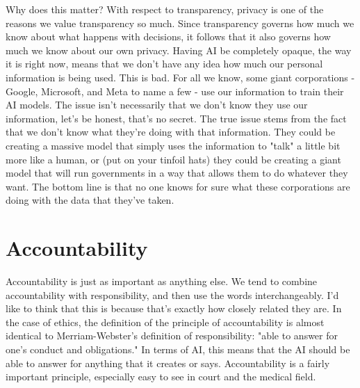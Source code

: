 \documentclass[12pt]{article}
\begin{document}
    Why does this matter? With respect to transparency, privacy is one of the reasons we value
    transparency so much. Since transparency governs how much we know about what happens with
    decisions, it follows that it also governs how much we know about our own privacy. Having AI
    be completely opaque, the way it is right now, means that we don't have any idea how much our
    personal information is being used. This is bad. For all we know, some giant corporations
    - Google, Microsoft, and Meta to name a few - use our information to train their AI models.
    The issue isn't necessarily that we don't know they use our information, let's be honest, 
    that's no secret. The true issue stems from the fact that we don't know what they're doing
    with that information. They could be creating a massive model that simply uses the information
    to "talk" a little bit more like a human, or (put on your tinfoil hats) they could be creating
    a giant model that will run governments in a way that allows them to do whatever they want.
    The bottom line is that no one knows for sure what these corporations are doing with the data
    that they've taken.

    \section{Accountability}
    Accountability is just as important as anything else. We tend to combine accountability with
    responsibility, and then use the words interchangeably. I'd like to think that this is because
    that's exactly how closely related they are. In the case of ethics, the definition of the principle
    of accountability is almost identical to Merriam-Webster's definition of responsibility: "able to 
    answer for one's conduct and obligations." In terms of AI, this means that the AI should be
    able to answer for anything that it creates or says. Accountability is a fairly important principle,
    especially easy to see in court and the medical field.
\end{document}
